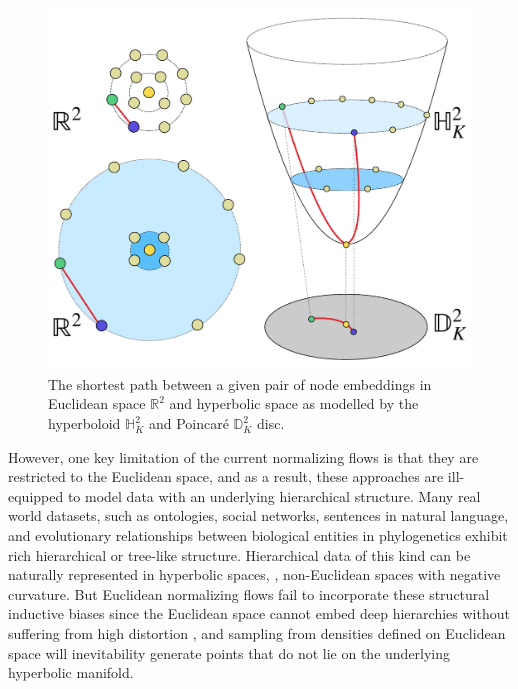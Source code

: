 \begin{figure}
    \centering
    \vspace{-10pt}
    \includegraphics[width=\linewidth]{explanatory_fig.pdf}
    \vspace{-10pt}
    \caption{The shortest path between a given pair of node embeddings in Euclidean space $\mathbb{R}^2$ and hyperbolic space as modelled by the hyperboloid $\mathbb{H}^2_K$ and Poincar\'e $\mathbb{D}^2_K$ disc. }
    \vspace{-10pt}
    \label{fig:my_label}
\end{figure}

However, one key limitation of the current normalizing flows is that they are restricted to the Euclidean space, and as a result, these approaches are ill-equipped to model data with an underlying hierarchical structure. %
Many real world datasets, such as ontologies, social networks, sentences in natural language, and evolutionary relationships between biological entities in phylogenetics exhibit rich hierarchical or tree-like structure.
Hierarchical data of this kind can be naturally represented in hyperbolic spaces, \ie, non-Euclidean spaces with negative curvature. 
But Euclidean normalizing flows fail to incorporate these structural inductive biases since the Euclidean space cannot embed deep hierarchies without suffering from high distortion \cite{sarkar2011low}, and sampling from densities defined on Euclidean space will inevitability generate points that do not lie on the underlying hyperbolic manifold. 

